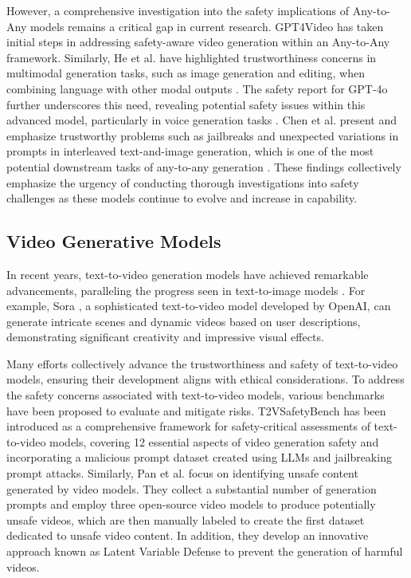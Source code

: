 However, a comprehensive investigation into the safety implications of Any-to-Any models remains a critical gap in current research. GPT4Video \citep{wang2023gpt4video} has taken initial steps in addressing safety-aware video generation within an Any-to-Any framework. Similarly, He et al. have highlighted trustworthiness concerns in multimodal generation tasks, such as image generation and editing, when combining language with other modal outputs \citep{he2024llms}. The safety report for GPT-4o further underscores this need, revealing potential safety issues within this advanced model, particularly in voice generation tasks \citep{openai_gpt4o_system_card}. Chen et al. present and emphasize trustworthy problems such as jailbreaks and unexpected variations in prompts in interleaved text-and-image generation, which is one of the most potential downstream tasks of any-to-any generation \citep{chen2024interleaved}. These findings collectively emphasize the urgency of conducting thorough investigations into safety challenges as these models continue to evolve and increase in capability.

\subsection{Video Generative Models}

In recent years, text-to-video generation models have achieved remarkable advancements, paralleling the progress seen in text-to-image models \cite{singer2022make, cho2024sora, liu2024sora, OpenAI2024sora}. For example, Sora \cite{sora_openai, liu2024sora}, a sophisticated text-to-video model developed by OpenAI, can generate intricate scenes and dynamic videos based on user descriptions, demonstrating significant creativity and impressive visual effects. 


Many efforts collectively advance the trustworthiness and safety of text-to-video models, ensuring their development aligns with ethical considerations. To address the safety concerns associated with text-to-video models, various benchmarks have been proposed to evaluate and mitigate risks. T2VSafetyBench \cite{miao2024t2vsafetybench} has been introduced as a comprehensive framework for safety-critical assessments of text-to-video models, covering 12 essential aspects of video generation safety and incorporating a malicious prompt dataset created using LLMs and jailbreaking prompt attacks. Similarly, Pan et al. \cite{pang2024towards} focus on identifying unsafe content generated by video models. They collect a substantial number of generation prompts and employ three open-source video models to produce potentially unsafe videos, which are then manually labeled to create the first dataset dedicated to unsafe video content. In addition, they develop an innovative approach known as Latent Variable Defense to prevent the generation of harmful videos.

